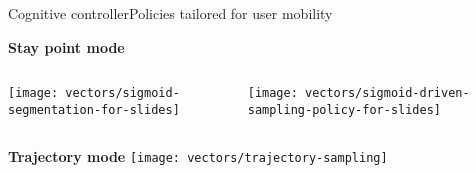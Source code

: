 \begin{frame}{Cognitive controller}{Policies tailored for user mobility}
\small
\vspace{-0.3cm}
\begin{block}{\small \textbf{Stay point mode}}
\begin{columns}
\begin{column}{0.45\textwidth}
{
  \centering
  \texttt{[image: vectors/sigmoid-segmentation-for-slides]}
}
\end{column}

\begin{column}{0.55\textwidth}
{
  \centering
  \texttt{[image: vectors/sigmoid-driven-sampling-policy-for-slides]}
}
\end{column}
\end{columns}
\end{block}

\begin{block}{\small \textbf{Trajectory mode}}
{
  \centering
  \texttt{[image: vectors/trajectory-sampling]}
}
\end{block}



\end{frame}

